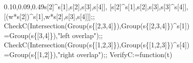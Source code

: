\documentclass[
  10pt,
  letterpaper,
]{article}
\newenvironment{Shaded}{}{}
\newcommand{\BuiltInTok}[1]{\textcolor[rgb]{0.00,0.50,0.00}{#1}}
\newcommand{\FloatTok}[1]{\textcolor[rgb]{0.25,0.63,0.44}{#1}}
\newcommand{\FunctionTok}[1]{\textcolor[rgb]{0.02,0.16,0.49}{#1}}
\newcommand{\NormalTok}[1]{#1}
\newcommand{\OperatorTok}[1]{\textcolor[rgb]{0.40,0.40,0.40}{#1}}
\newcommand{\StringTok}[1]{\textcolor[rgb]{0.25,0.44,0.63}{#1}}
\newcommand{\VariableTok}[1]{\textcolor[rgb]{0.10,0.09,0.49}{#1}}
\begin{document}
\begin{Shaded}
\begin{Highlighting}[]
\NormalTok{ [}\VariableTok{s}\NormalTok{[}\FloatTok{2}\NormalTok{]}\OperatorTok{\^{}}\VariableTok{s}\NormalTok{[}\FloatTok{1}\NormalTok{]}\OperatorTok{,}\VariableTok{s}\NormalTok{[}\FloatTok{2}\NormalTok{]}\OperatorTok{,}\VariableTok{s}\NormalTok{[}\FloatTok{3}\NormalTok{]}\OperatorTok{,}\VariableTok{s}\NormalTok{[}\FloatTok{4}\NormalTok{]]}\OperatorTok{,}
\NormalTok{ [}\VariableTok{s}\NormalTok{[}\FloatTok{2}\NormalTok{]}\OperatorTok{\^{}}\VariableTok{s}\NormalTok{[}\FloatTok{1}\NormalTok{]}\OperatorTok{,}\VariableTok{s}\NormalTok{[}\FloatTok{2}\NormalTok{]}\OperatorTok{,}\VariableTok{s}\NormalTok{[}\FloatTok{3}\NormalTok{]}\OperatorTok{,}\VariableTok{s}\NormalTok{[}\FloatTok{3}\NormalTok{]}\OperatorTok{\^{}}\VariableTok{s}\NormalTok{[}\FloatTok{4}\NormalTok{]]}\OperatorTok{,}
\NormalTok{ [(}\VariableTok{w}\OperatorTok{*}\VariableTok{s}\NormalTok{[}\FloatTok{2}\NormalTok{])}\OperatorTok{\^{}}\VariableTok{s}\NormalTok{[}\FloatTok{1}\NormalTok{]}\OperatorTok{,}\VariableTok{w}\OperatorTok{*}\VariableTok{s}\NormalTok{[}\FloatTok{2}\NormalTok{]}\OperatorTok{,}\VariableTok{s}\NormalTok{[}\FloatTok{3}\NormalTok{]}\OperatorTok{,}\VariableTok{s}\NormalTok{[}\FloatTok{4}\NormalTok{]]]}\OperatorTok{;;}
\VariableTok{CheckC}\NormalTok{(}\BuiltInTok{Intersection}\NormalTok{(}\BuiltInTok{Group}\NormalTok{(}\VariableTok{s}\NormalTok{\{[}\FloatTok{2}\OperatorTok{,}\FloatTok{3}\OperatorTok{,}\FloatTok{4}\NormalTok{]\})}\OperatorTok{,}\BuiltInTok{Group}\NormalTok{(}\VariableTok{s}\NormalTok{\{[}\FloatTok{2}\OperatorTok{,}\FloatTok{3}\OperatorTok{,}\FloatTok{4}\NormalTok{]\})}\OperatorTok{\^{}}\VariableTok{s}\NormalTok{[}\FloatTok{1}\NormalTok{])}
 \OperatorTok{=}\BuiltInTok{Group}\NormalTok{(}\VariableTok{s}\NormalTok{\{[}\FloatTok{3}\OperatorTok{,}\FloatTok{4}\NormalTok{]\})}\OperatorTok{,}\StringTok{"left overlap"}\NormalTok{)}\OperatorTok{;;}
\VariableTok{CheckC}\NormalTok{(}\BuiltInTok{Intersection}\NormalTok{(}\BuiltInTok{Group}\NormalTok{(}\VariableTok{s}\NormalTok{\{[}\FloatTok{1}\OperatorTok{,}\FloatTok{2}\OperatorTok{,}\FloatTok{3}\NormalTok{]\})}\OperatorTok{,}\BuiltInTok{Group}\NormalTok{(}\VariableTok{s}\NormalTok{\{[}\FloatTok{1}\OperatorTok{,}\FloatTok{2}\OperatorTok{,}\FloatTok{3}\NormalTok{]\})}\OperatorTok{\^{}}\VariableTok{s}\NormalTok{[}\FloatTok{4}\NormalTok{])}
 \OperatorTok{=}\BuiltInTok{Group}\NormalTok{(}\VariableTok{s}\NormalTok{\{[}\FloatTok{1}\OperatorTok{,}\FloatTok{2}\NormalTok{]\})}\OperatorTok{,}\StringTok{"right overlap"}\NormalTok{)}\OperatorTok{;;}
\VariableTok{VerifyC}\OperatorTok{:=}\FunctionTok{function}\NormalTok{(}\VariableTok{t}\NormalTok{)}

\end{Highlighting}
\end{Shaded}
\end{document}
